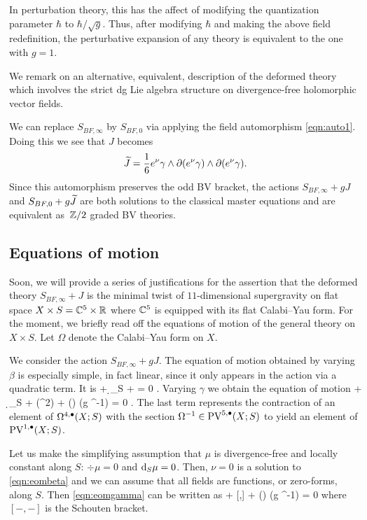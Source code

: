 In perturbation theory, this has the affect of modifying the quantization parameter $\hbar$ to $\hbar / \sqrt{g}$.
Thus, after modifying $\hbar$ and making the above field redefinition, the perturbative expansion of any theory is equivalent to the one with $g = 1$. 

\parsec[s:altdfn]

We remark on an alternative, equivalent, description of the deformed theory which involves the strict dg Lie algebra structure on divergence-free holomorphic vector fields.

We can replace $S_{BF,\infty}$ by $S_{BF,0}$ via applying the field automorphism \eqref{eqn:auto1}.
Doing this we see that $J$ becomes 
\[
\widetilde{J} = \frac16 e^\nu \gamma \wedge \partial (e^\nu \gamma) \wedge \partial(e^\nu \gamma) .
\]
Since this automorphism preserves the odd BV bracket, the actions $S_{BF,\infty} + g J$ and $S_{BF, 0} + g \widetilde{J}$ are both solutions to the classical master equations and are equivalent as~$\mathbb Z/2$ graded BV theories.

\subsection{Equations of motion}

Soon, we will provide a series of justifications for the assertion that the deformed theory $S_{BF, \infty} + J$ is the minimal twist of $11$-dimensional supergravity on flat space $X \times S = \mathbb C^5 \times \mathbb R$ where $\mathbb C^5$ is equipped with its flat Calabi--Yau form. 
For the moment, we briefly read off the equations of motion of the general theory on $X \times S$.
Let $\Omega$ denote the Calabi--Yau form on $X$. 

We consider the action $S_{BF, \infty} + gJ$.
The equation of motion obtained by varying $\beta$ is especially simple, in fact linear, since it only appears in the action via a quadratic term. 
It is
\beqn\label{eqn:eombeta}
\dbar \nu + \d_S \nu + \div \mu = 0 .
\eeqn
Varying $\gamma$ we obtain the equation of motion
\beqn\label{eqn:eomgamma}
\dbar \mu + \d_S \mu +   \div (\mu^2) +  (\del \gamma \wedge \del \gamma) \vee (g \Omega^{-1}) = 0 .
\eeqn
The last term represents the contraction of an element of $\Omega^{4,\bullet}(X;S)$ with the section $\Omega^{-1} \in {\rm PV}^{5,\bullet}(X;S)$ to yield an element of ${\rm PV}^{1,\bullet}(X;S)$. 

Let us make the simplifying assumption that $\mu$ is divergence-free and locally constant along $S$: $\div \mu = 0$ and ${\rm d}_S \mu = 0$.
Then, $\nu = 0$ is a solution to \eqref{eqn:eombeta} and we can assume that all fields are functions, or zero-forms, along $S$. 
Then \eqref{eqn:eomgamma} can be written as 
\beqn\label{eqn:eomgamma1}
\dbar \mu +  [\mu,\mu] +  (\del \gamma \wedge \del \gamma) \vee (g \Omega^{-1}) = 0 
\eeqn
where $[-,-]$ is the Schouten bracket. 

